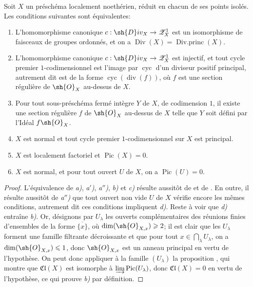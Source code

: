 \begin{corollary}[21.7.6]
\label{IV.21.7.6}
Soit $X$ un préschéma localement noethérien, réduit en chacun de ses points isolés.
Les conditions suivantes sont équivalentes:
\begin{enumerate}
  \item[\emph{a)}] L'homomorphisme canonique $c:\sh{D}iv_X\to\mathscr{Z}_X^1$ est un isomorphisme de faisceaux de groupes ordonnés, et on a $\operatorname{Div}(X)=\operatorname{Div.princ}(X)$.
  \item[\emph{a$'$)}] L'homomorphisme canonique $c:\sh{D}iv_X\to\mathscr{Z}_X^1$ est injectif, et tout cycle premier $1$-codimensionnel est l'image par $\operatorname{cyc}$ d'un diviseur positif principal, autrement dit est de la forme $\operatorname{cyc}(\operatorname{div}(f))$, où $f$ est une section régulière de $\sh{O}_X$ au-dessus de $X$.
  \item[\emph{a$''$)}] Pour tout sous-préschéma fermé intègre $Y$ de $X$, de codimension $1$, il existe une section régulière $f$ de $\sh{O}_X$ au-dessus de $X$ telle que $Y$ soit défini par l'Idéal $f\sh{O}_X$.
  \item[\emph{b)}] $X$ est normal et tout cycle premier $1$-codimensionnel sur $X$ est principal.
  \item[\emph{c)}] $X$ est localement factoriel et $\operatorname{Pic}(X)=0$.
  \item[\emph{d)}] $X$ est normal, et pour tout ouvert $U$ de $X$, on a $\operatorname{Pic}(U)=0$.
\end{enumerate}
\end{corollary}

\begin{proof}
L'équivalence de \emph{a)}, \emph{a$'$)}, \emph{a$''$)}, \emph{b)} et \emph{c)} résulte aussitôt de  et de .
En outre, il résulte aussitôt de \emph{a$''$)} que tout ouvert non vide $U$ de $X$ vérifie encore les mêmes conditions, autrement dit ces conditions impliquent \emph{d)}.
Reste à voir que \emph{d)} entraîne \emph{b)}.
Or, désignons par $U_\lambda$ les ouverts complémentaires des réunions finies d'ensembles de la forme $\overline{\{x\}}$, où $\dim(\sh{O}_{X,x})\geq2$;
il est clair que les $U_\lambda$ forment une famille filtrante décroissante et que pour tout $x\in\bigcap_\lambda U_\lambda$, on a $\dim(\sh{O}_{X,x})\leq1$, donc $\sh{O}_{X,x}$ est un anneau principal en vertu de l'hypothèse.
On peut donc appliquer à la famille $(U_\lambda)$ la proposition , qui montre que $\mathfrak{Cl}(X)$ est isomorphe à $\varinjlim\operatorname{Pic}(U_\lambda)$, donc $\mathfrak{Cl}(X)=0$ en vertu de l'hypothèse, ce qui prouve \emph{b)} par définition.
\end{proof}

